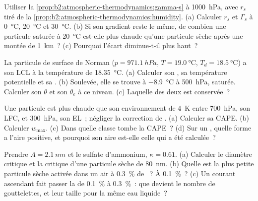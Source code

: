 \begin{exercise}[$\star\star$]\label{exo:b2:atmospheric-thermodynamics:6}
Utiliser la \cref{prop:b2:atmospheric-thermodynamics:gamma-s} à \qty{1000}{hPa}, avec $r_s$
tiré de la \cref{prop:b2:atmospheric-thermodynamics:humidity}. (a) Calculer $r_s$ et $\Gamma_s$
à \qty{0}{\celsius}, \qty{20}{\celsius} et \qty{30}{\celsius}. (b) Si son gradient reste le
même, de combien une particule saturée à \qty{20}{\celsius} est-elle plus chaude qu'une
particule sèche après une montée de \qty{1}{km}~? (c) Pourquoi l'écart diminue-t-il plus haut~?
\end{exercise}

\begin{exercise}[$\star\star$]\label{exo:b2:atmospheric-thermodynamics:7}
La particule de surface de Norman ($p = \qty{971.1}{hPa}$, $T = \qty{19.0}{\celsius}$, $T_d =
\qty{18.5}{\celsius}$) a son LCL à la température de \qty{18.35}{\celsius}. (a) Calculer
son , sa température potentielle et sa .
(b) Soulevée, elle se trouve à \qty{-8.9}{\celsius} à \qty{500}{hPa}, saturée.
Calculer son $\theta$ et son $\theta_e$ à ce niveau. (c) Laquelle des deux est conservée~?
\end{exercise}

\begin{exercise}[$\star\star$]\label{exo:b2:atmospheric-thermodynamics:8}
Une particule est plus chaude que son environnement de \qty{4}{K} entre \qty{700}{hPa}, son LFC,
et \qty{300}{hPa}, son EL~; négliger la correction de . (a) Calculer sa
CAPE. (b) Calculer $w_{\max}$. (c) Dans quelle classe tombe la CAPE~? (d) Sur un , quelle forme a l'aire positive, et pourquoi son aire est-elle celle qui a été calculée~?
\end{exercise}

\begin{exercise}[$\star\star$]\label{exo:b2:atmospheric-thermodynamics:9}
Prendre $A = \qty{2.1}{nm}$ et le sulfate d'ammonium, $\kappa = 0.61$. (a) Calculer le diamètre
critique et la  critique d'une particule sèche de \qty{80}{nm}. (b) Quelle est la plus
petite particule sèche activée dans un air à \qty{0.3}{\percent} de ~? À
\qty{0.1}{\percent}~? (c) Un courant ascendant fait passer la  de \qty{0.1}{\percent} à
\qty{0.3}{\percent}~: que devient le nombre de gouttelettes, et leur taille pour la même eau liquide~?
\end{exercise}


